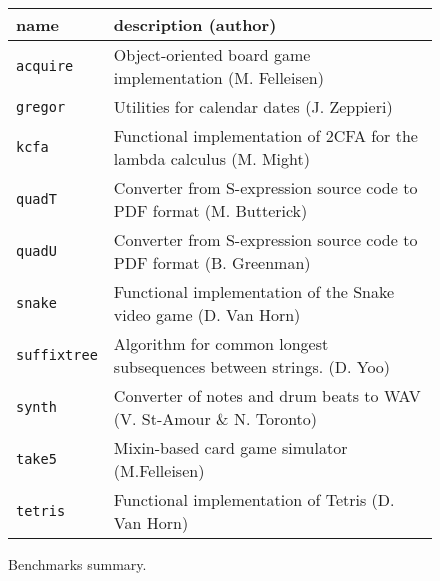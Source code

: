 

\begin{figure}
\begin{tabular}{p{1.75cm} | p{6cm} }
  {\bf  name} & {\bf description (author)}  \\

\hline
  \texttt{acquire} & Object-oriented board game implementation (M. Felleisen)  \\%

\hline
  \texttt{gregor} & Utilities for calendar dates (J. Zeppieri) \\%

\hline
  \texttt{kcfa} & Functional implementation of 2CFA for the lambda calculus (M. Might) \\%

\hline
  \texttt{quadT} & Converter from S-expression source code to PDF format (M. Butterick)\\%

\hline
  \texttt{quadU} & Converter from S-expression source code to PDF format  (B. Greenman) \\%

\hline
  \texttt{snake} & Functional implementation of the  Snake video game (D. Van Horn) \\%

\hline
  \texttt{suffixtree} & Algorithm for common longest subsequences between strings. (D. Yoo) \\%

\hline
  \texttt{synth} & Converter of notes and drum beats to WAV (V. St-Amour \& N. Toronto) \\%

\hline
  \texttt{take5} & Mixin-based card game simulator (M.Felleisen)  \\%

\hline
  \texttt{tetris} & Functional implementation of Tetris (D. Van Horn) \\%

\end{tabular}
  \caption{Benchmarks summary.}
  \label{table:benchmark-descriptions}
\end{figure}
